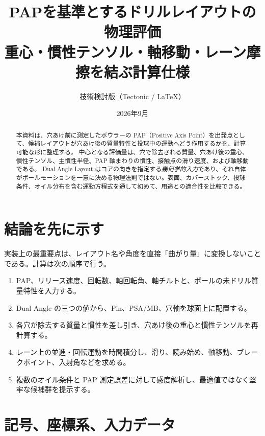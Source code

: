 \documentclass[11pt,a4paper]{article}
\title{\textbf{PAPを基準とするドリルレイアウトの物理評価}\\
\large 重心・慣性テンソル・軸移動・レーン摩擦を結ぶ計算仕様}
\author{技術検討版（Tectonic / LaTeX）}
\date{2026年9月}
\begin{document}
\maketitle

\begin{abstract}
本資料は、穴あけ前に測定したボウラーの PAP（Positive Axis Point）を出発点として、候補レイアウトが穴あけ後の質量特性と投球中の運動へどう作用するかを、計算可能な形に整理する。
中心となる評価量は、穴で除去される質量、穴あけ後の重心、慣性テンソル、主慣性半径、PAP 軸まわりの慣性、接触点の滑り速度、および軸移動である。
Dual Angle Layout はコアの向きを指定する\emph{幾何学的入力}であり、それ自体がボールモーションを一意に決める物理法則ではない。表面、カバーストック、投球条件、オイル分布を含む運動方程式を通して初めて、用途との適合性を比較できる。
\end{abstract}

\section{結論を先に示す}

実装上の最重要点は、レイアウト名や角度を直接「曲がり量」に変換しないことである。計算は次の順序で行う。

\begin{enumerate}
  \item PAP、リリース速度、回転数、軸回転角、軸チルトと、ボールの未ドリル質量特性を入力する。
  \item Dual Angle の三つの値から、Pin、PSA/MB、穴軸を球面上に配置する。
  \item 各穴が除去する質量と慣性を差し引き、穴あけ後の重心と慣性テンソルを再計算する。
  \item レーン上の並進・回転運動を時間積分し、滑り、読み始め、軸移動、ブレークポイント、入射角などを求める。
  \item 複数のオイル条件と PAP 測定誤差に対して感度解析し、最適値ではなく堅牢な候補群を提示する。
\end{enumerate}


\section{記号、座標系、入力データ}
\end{document}
